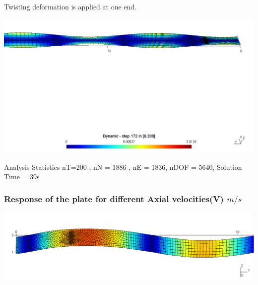 \documentclass[9pt]{beamer}
\begin{document}
\begin{frame}

Twisting deformation is applied at one end.

\begin{figure}[h!]
\centering

\end{figure}

\href{run:ParaStudy_onlydata/N2/3E7/Dynamic.mpg}{\includegraphics[width=1.0\textwidth,trim={0cm 15cm 0cm 1cm},clip]{ParaStudy_onlydata/twist.png}}


\begin{block}{Analysis Statistics}
nT=200 , nN = 1886 , nE = 1836, nDOF = 5640, Solution Time = 39s

\end{block}


\end{frame}







\begin{frame}
\frametitle{Response of the plate for different Axial velocities(V) $m/s $}
\begin{figure}[h!]
\centering

\end{figure}


\href{run:Young/1E11/Dynamic.mpg}{\includegraphics[width=1.0\textwidth,trim={0cm 0cm 0cm 0cm},clip]{ParaStudy_onlydata/Young/1E11/Dynamic.png}}



\end{frame}
\end{document}

